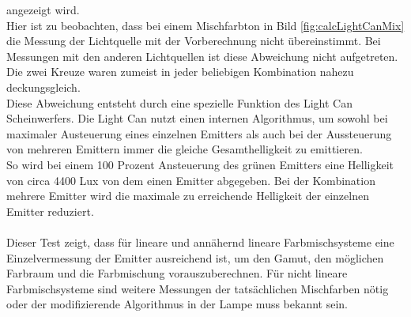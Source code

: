 \documentclass[11pt]{scrartcl}
\begin{document}
angezeigt wird.\\
Hier ist zu beobachten, dass bei einem Mischfarbton in Bild \ref{fig:calcLightCanMix} die Messung der Lichtquelle mit der Vorberechnung nicht
übereinstimmt. Bei Messungen mit den anderen Lichtquellen ist diese Abweichung nicht aufgetreten. Die zwei Kreuze waren zumeist in jeder beliebigen
Kombination nahezu deckungsgleich.\\
Diese Abweichung entsteht durch eine spezielle Funktion des Light Can Scheinwerfers. Die Light Can nutzt einen internen Algorithmus, um sowohl bei
maximaler Austeuerung eines einzelnen Emitters als auch bei der Aussteuerung von mehreren Emittern immer die gleiche Gesamthelligkeit zu
emittieren.\\
So wird bei einem 100 Prozent Ansteuerung des grünen Emitters eine Helligkeit von circa 4400 Lux von dem einen Emitter abgegeben. Bei der
Kombination mehrere Emitter wird die maximale zu erreichende Helligkeit der einzelnen Emitter reduziert.\\
\\
Dieser Test zeigt, dass für lineare und annähernd lineare Farbmischsysteme eine Einzelvermessung der Emitter ausreichend ist, um den Gamut, den möglichen
Farbraum und die Farbmischung vorauszuberechnen. Für nicht lineare Farbmischsysteme sind weitere Messungen der tatsächlichen Mischfarben nötig oder der
modifizierende Algorithmus in der Lampe muss bekannt sein.
\end{document}
